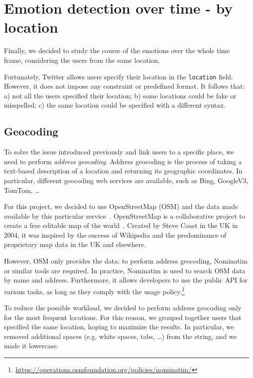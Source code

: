 \section{Emotion detection over time - by location}
\label{sec:emotion-by-location}

Finally, we decided to study the course of the emotions over the whole time frame, considering the users from the same location.

Fortunately, Twitter allows users specify their location in the \texttt{location} field. However, it does not impose any constraint or predefined format. It follows that: a) not all the users specified their location; b) some locations could be fake or misspelled; c) the same location could be specified with a different syntax.

\subsection{Geocoding}
\label{subsec:geocoding}

To solve the issue introduced previously and link users to a specific place, we need to perform \textit{address geocoding}. Address geocoding is the process of taking a text-based description of a location and returning its geographic coordinates. In particular, different geocoding web services are available, such as Bing, GoogleV3, TomTom, \ldots

For this project, we decided to use OpenStreetMap (OSM) and the data made available by this particular service~\cite{osm}. OpenStreetMap is a collaborative project to create a free editable map of the world~\cite{enwiki:1028995235}. Created by Steve Coast in the UK in 2004, it was inspired by the success of Wikipedia and the predominance of proprietary map data in the UK and elsewhere.

However, OSM only provides the data: to perform address geocoding, Nominatim or similar tools are required. In practice, Nominatim is used to search OSM data by name and address. Furthermore, it allows developers to use the public API for various tasks, as long as they comply with the usage policy.\footnote{\url{https://operations.osmfoundation.org/policies/nominatim/}}

To reduce the possible workload, we decided to perform address geocoding only for the most frequent locations. For this reason, we grouped together users that specified the same location, hoping to maximize the results. In particular, we removed additional spaces (e.g. white spaces, tabs, \ldots) from the string, and we made it lowercase.

